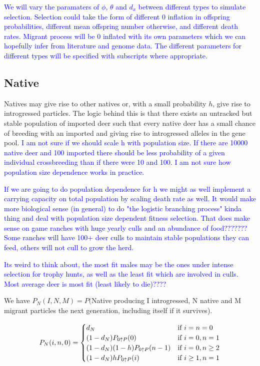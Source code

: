\documentclass[12pt]{article}
\begin{document}
\textcolor{blue}{We will vary the paramaters of $\phi$, $\theta$ and $d_{x}$ between different types to simulate selection. Selection could take the form of different 0 inflation in offspring probabilities, different mean offspring number otherwise, and different death rates. Migrant process will be 0 inflated with its own parameters which we can hopefully infer from literature and genome data. The different parameters for different types will be specified with subscripts where appropriate.}

\subsection{Native}

Natives may give rise to other natives or, with a small probability $h$, give rise to introgressed particles. The logic behind this is that there exists an untracked but stable population of imported deer such that every native deer has a small chance of breeding with an imported and giving rise to introgressed alleles in the gene pool. \textcolor{blue}{I am not sure if we should scale h with population size. If there are 10000 native deer and 100 imported there should be less probability of a given individual crossbreeding than if there were 10 and 100. I am not sure how population size dependence works in practice.}


\textcolor{blue}{If we are going to do population dependence for h we might as well implement a carrying capacity on total population by scaling death rate as well. It would make more biological sense (in general) to do "the logistic branching process" kinda thing and deal with population size dependent fitness selection. That does make sense on game ranches with huge yearly culls and an abundance of food??????? Some ranches will have 100+ deer culls to maintain stable populations they can feed, others will not cull to grow the herd.}

\textcolor{blue}{Its weird to think about, the most fit males may be the ones under intense selection for trophy hunts, as well as the least fit which are involved in culls. Most average deer is most fit (least likely to die)????} 

We have $P_N(I,N,M) = P($Native producing I introgressed, N native and M migrant particles the next generation, including itself if it survives).

\begin{equation}
    P_N(i,n,0) = 
    \begin{cases}
    d_N & \text{if $ i = n = 0$} \\
    (1-d_N) P_{0 \uparrow P}(0) & \text{if $i = 0, n = 1$} \\
    (1-d_N)(1-h)P_{0 \uparrow P}(n - 1) & \text{if $i=0,n \geq 2$} \\
    (1-d_N) h P_{0 \uparrow P}(i) & \text{if $i \geq 1, n = 1$}
    \end{cases}
\end{equation}
\end{document}
